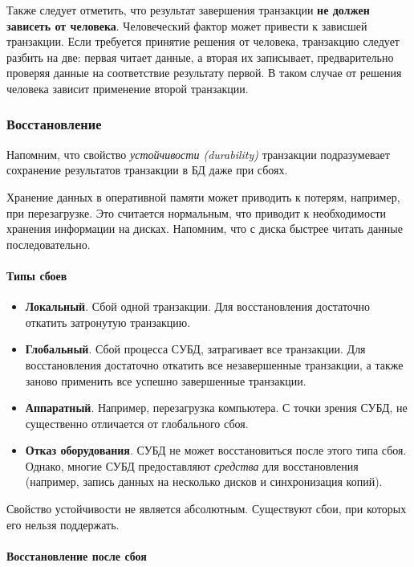 Также следует отметить, что результат завершения транзакции
\textbf{не должен зависеть от человека}. Человеческий фактор может привести к
зависшей транзакции. Если требуется принятие решения от человека, транзакцию
следует разбить на две: первая читает данные, а вторая их записывает,
предварительно проверяя данные на соответствие результату первой. В таком
случае от решения человека зависит применение второй транзакции.

\subsubsection{Восстановление}

Напомним, что свойство \textit{устойчивости (durability)} транзакции
подразумевает сохранение результатов транзакции в БД даже при сбоях.

Хранение данных в оперативной памяти может приводить к потерям, например, при
перезагрузке. Это считается нормальным, что приводит к необходимости хранения
информации на дисках. Напомним, что с диска быстрее читать данные
последовательно.

\paragraph{Типы сбоев}

\begin{itemize}
    \item \textbf{Локальный}. Сбой одной транзакции. Для восстановления
        достаточно откатить затронутую транзакцию.
    \item \textbf{Глобальный}. Сбой процесса СУБД, затрагивает все транзакции.
        Для восстановления достаточно откатить все незавершенные транзакции, а
        также заново применить все успешно завершенные транзакции.
    \item \textbf{Аппаратный}. Например, перезагрузка компьютера. С точки
        зрения СУБД, не существенно отличается от глобального сбоя.
    \item \textbf{Отказ оборудования}. СУБД не может восстановиться после этого
        типа сбоя. Однако, многие СУБД предоставляют \textit{средства}
        для восстановления (например, запись данных на несколько дисков и
        синхронизация копий).
\end{itemize}

Свойство устойчивости не является абсолютным. Существуют сбои, при которых его
нельзя поддержать.

\paragraph{Восстановление после сбоя}


